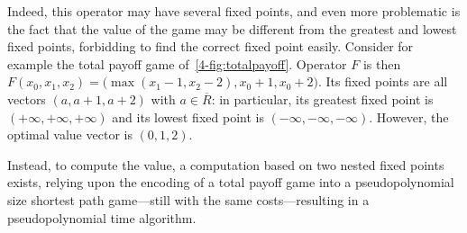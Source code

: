 Indeed, this operator may have several fixed points, and even more
problematic is the fact that the value of the game may be different
from the greatest and lowest fixed points, forbidding to find the
correct fixed point easily. Consider for example the total payoff game
of~\cref{4-fig:totalpayoff}. Operator $F$ is then
$F(x_0,x_1,x_2) = \big(\max(x_1-1,x_2-2),x_0+1,x_0+2\big)$. Its fixed
points are all vectors $(a,a+1,a+2)$ with $a\in \overline R$: in
particular, its greatest fixed point is $(+\infty, +\infty, +\infty)$
and its lowest fixed point is $(-\infty, -\infty, -\infty)$. However,
the optimal value vector is $(0,1,2)$.

Instead, to compute the value, a computation based on two nested fixed
points exists, relying upon the encoding of a total payoff game into a
pseudopolynomial size shortest path game---still with the same
costs---resulting in a pseudopolynomial time algorithm.

